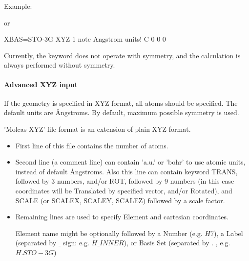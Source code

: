 \begin{keywordlist}
Example:


or

\begin{inputlisting}
XBAS=STO-3G
XYZ
1
 note Angstrom units!
C 0 0 0
\end{inputlisting}

Currently, the  keyword does not operate with symmetry, and 
the calculation is always performed without symmetry.

\end{keywordlist}

\paragraph{Advanced XYZ input}
If the geometry is specified in XYZ format, all atoms should be specified.
The default units are {\AA}ngstroms. By default, maximum possible symmetry is used.

'Molcas XYZ' file format is an extension of plain XYZ format.
\begin{itemize}
\item[]
First line of this file contains the number of atoms.
\item[]
Second line (a comment line) can contain 'a.u.' or 'bohr' to
use atomic units, instead of default {\AA}ngstroms.
Also this line can contain keyword TRANS, followed by 3 numbers,
and/or ROT, followed by 9 numbers (in this case coordinates
will be Translated by specified vector, and/or Rotated), and SCALE (or
SCALEX, SCALEY, SCALEZ) followed by a scale factor.
\item[]
Remaining lines are used to specify Element and cartesian
coordinates.

Element name might be optionally followed by a Number (e.g. $H7$),
a Label (separated by $\_$ sign: e.g. $H\_INNER$), or Basis Set (separated by . ,
e.g. $H.STO-3G$)
\end{itemize}

